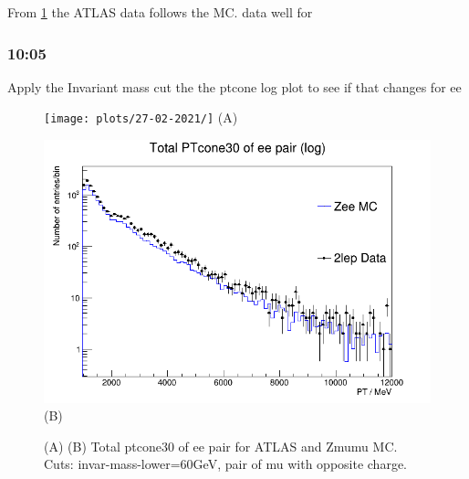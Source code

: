 From \ref{} the ATLAS data follows the MC. data well for 


\subsubsection*{10:05}
Apply the Invariant mass cut the the ptcone log plot to see if that changes for ee


\begin{figure}[h!]
    \centering
    \begin{minipage}{0.5\textwidth}
        \centering
        \texttt{[image: plots/27-02-2021/]}
        (A)
    \end{minipage}\hfill
    \begin{minipage}{0.5\textwidth}
        \centering
        \includegraphics[width=\linewidth]{plots/27-02-2021/2-Stack-Zee-2lep-fast_(basic-and_invarmass-lower=60GeV)_27-02-21_10-10).png}
        (B)
    \end{minipage}
    \caption{(A)  (B) Total ptcone30 of ee pair for ATLAS and Zmumu MC. Cuts: invar-mass-lower=60GeV, pair of mu with opposite charge.}
    \label{}
\end{figure}

